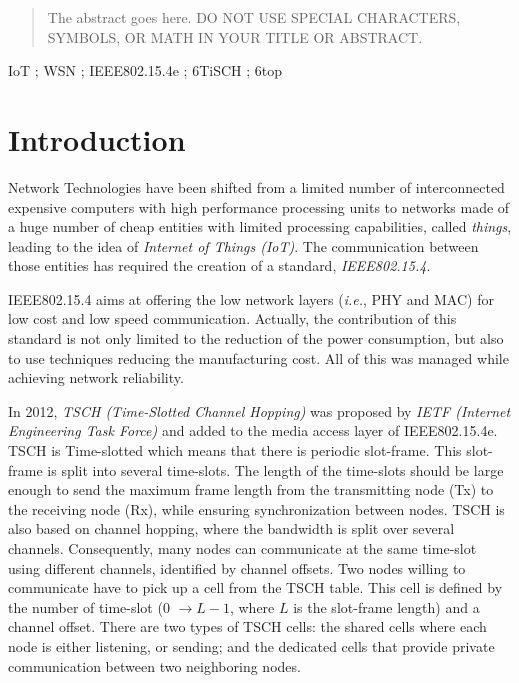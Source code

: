 \documentclass[10pt, conference, compsocconf]{IEEEtran}
\begin{document}
\begin{abstract}
The abstract goes here. DO NOT USE SPECIAL CHARACTERS, SYMBOLS, OR MATH IN YOUR TITLE OR ABSTRACT.

\end{abstract}

\begin{IEEEkeywords}
 \hspace{.1cm} IoT ; WSN ; IEEE802.15.4e ; 6TiSCH ; 6top

\end{IEEEkeywords}




\IEEEpeerreviewmaketitle



\section{Introduction}

Network Technologies have been shifted from a limited number of interconnected expensive computers with high performance processing units to networks made of a huge number of  cheap entities with limited processing capabilities, called {\em things}, leading to the idea of {\em Internet of Things (IoT)}. The communication between those entities has required the creation of a standard, {\em IEEE802.15.4}.

IEEE802.15.4 aims at offering the low network layers ({\em i.e.}, PHY and MAC) for low cost and low speed communication. Actually, the contribution of this standard is not only limited to the reduction of the power consumption, but also to use techniques reducing  the manufacturing cost. All of this was managed while achieving network reliability. 

In 2012, {\em TSCH (Time-Slotted Channel Hopping)} was proposed by  {\em IETF (Internet Engineering Task Force)} and added to the media access layer of IEEE802.15.4e. TSCH is Time-slotted which means that there is periodic slot-frame. This slot-frame is split into several time-slots. The length of the time-slots should be large enough to send the maximum frame length from the transmitting node (Tx) to the receiving node (Rx), while ensuring synchronization between nodes. TSCH is also based on channel hopping, where the bandwidth is split over several channels. Consequently, many nodes can communicate at the same time-slot using different channels, identified by channel offsets. Two nodes willing to communicate have to pick up a cell from the TSCH table. This cell is defined by the number of time-slot (0 $\rightarrow L-1$, where $L$ is the slot-frame length) and a channel offset. There are two types of TSCH cells: the shared cells where each node is either listening, or sending; and the dedicated cells that provide private communication between two neighboring nodes. 
\end{document}
